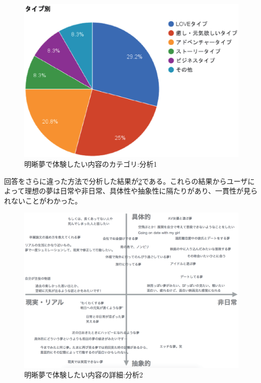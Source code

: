 \begin{figure}[htbp]
\begin{center}
\includegraphics[width=15cm]{eps/dreamType.eps}
\caption{明晰夢で体験したい内容のカテゴリ:分析1}
\label{desiredDreamTpye}
\end{center}
\end{figure}

回答をさらに違った方法で分析した結果が\ref{desiredDreamTpye2}である。これらの結果からユーザによって理想の夢は日常や非日常、具体性や抽象性に隔たりがあり、一貫性が見られないことがわかった。

\begin{figure}[htbp]
\begin{center}
\includegraphics[width=13cm]{eps/whatYouWantToDream.eps}
\caption{明晰夢で体験したい内容の詳細:分析2}
\label{desiredDreamTpye2}
\end{center}
\end{figure}


